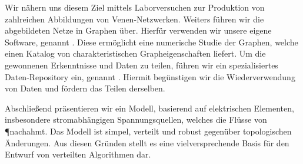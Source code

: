 	Wir nähern uns diesem Ziel mittels Laborversuchen zur Produktion von zahlreichen Abbildungen von Venen-Netzwerken. Weiters führen wir die abgebildeten Netze in Graphen über. Hierfür verwenden wir unsere eigene Software, genannt \NEFI. Diese ermöglicht eine numerische Studie der Graphen, welche einen Katalog von charakteristischen Grapheigenschaften liefert. Um die gewonnenen Erkenntnisse und Daten zu teilen, führen wir ein spezialisiertes Daten-Repository ein, genannt \SMGR. Hiermit begünstigen wir die Wiederverwendung von Daten und fördern das Teilen derselben.

	Abschließend präsentieren wir ein Modell, basierend auf elektrischen Elementen, insbesondere stromabhängigen Spannungsquellen, welches die Flüsse von \P nachahmt. Das Modell ist simpel, verteilt und robust gegenüber topologischen Änderungen. Aus diesen Gründen stellt es eine vielversprechende Basis für den Entwurf von verteilten Algorithmen dar.


\vfill
